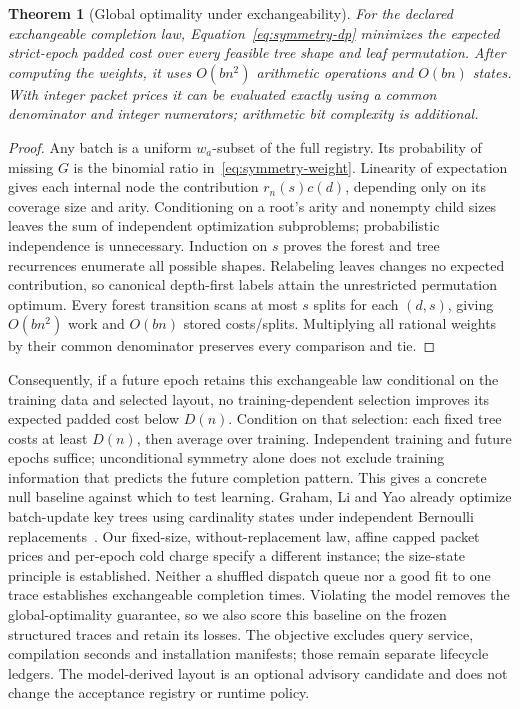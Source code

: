 \documentclass[10pt,journal,compsoc]{IEEEtran}
\newtheorem{theorem}{Theorem}
\theoremstyle{definition}\newtheorem{definition}[theorem]{Definition}
\begin{document}
\begin{theorem}[Global optimality under exchangeability]\label{thm:symmetry}
For the declared exchangeable completion law, Equation~\eqref{eq:symmetry-dp}
minimizes the expected strict-epoch padded cost over every feasible tree
shape and leaf permutation. After computing the weights, it uses
$O(bn^2)$ arithmetic operations and $O(bn)$ states. With integer packet
prices it can be evaluated exactly using a common denominator and integer
numerators; arithmetic bit complexity is additional.
\end{theorem}
\begin{proof}
Any batch is a uniform $w_a$-subset of the full registry. Its probability
of missing $G$ is the binomial ratio in~\eqref{eq:symmetry-weight}.
Linearity of expectation gives each internal node the contribution
$r_n(s)c(d)$, depending only on its coverage size and arity. Conditioning
on a root's arity and nonempty child sizes leaves the sum of independent
optimization subproblems; probabilistic independence is unnecessary.
Induction on $s$ proves the forest and tree recurrences enumerate all
possible shapes. Relabeling leaves changes no expected contribution, so
canonical depth-first labels attain the unrestricted permutation optimum.
Every forest transition scans at most $s$ splits for each $(d,s)$,
giving $O(bn^2)$ work and $O(bn)$ stored costs/splits. Multiplying all rational
weights by their common denominator preserves every comparison and tie.
\end{proof}

Consequently, if a future epoch retains this exchangeable law conditional
on the training data and selected layout, no training-dependent selection
improves its expected padded cost below $D(n)$. Condition on that selection:
each fixed tree costs at least $D(n)$, then average over training. Independent
training and future epochs suffice; unconditional symmetry alone does not
exclude training information that predicts the future completion pattern.
This gives a concrete null baseline against which to test learning.
Graham, Li and Yao already optimize batch-update key trees using cardinality
states under independent Bernoulli replacements~\cite{graham2007}.
Our fixed-size, without-replacement law, affine capped packet prices and
per-epoch cold charge specify a different instance; the size-state principle
is established. Neither a shuffled dispatch queue nor a good
fit to one trace establishes exchangeable completion times. Violating the
model removes the global-optimality guarantee, so we also score this baseline
on the frozen structured traces and retain its losses. The objective excludes
query service, compilation seconds and installation manifests; those remain
separate lifecycle ledgers. The model-derived layout is an optional advisory
candidate and does not change the acceptance registry or runtime policy.
\end{document}
